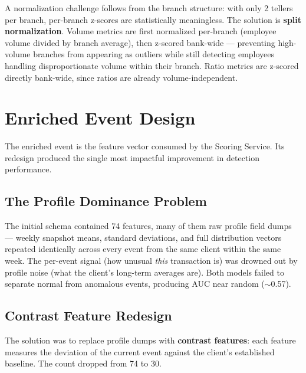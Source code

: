 A normalization challenge follows from the branch structure: with only 2 tellers per branch, per-branch z-scores are statistically meaningless. The solution is \textbf{split normalization}. Volume metrics are first normalized per-branch (employee volume divided by branch average), then z-scored bank-wide --- preventing high-volume branches from appearing as outliers while still detecting employees handling disproportionate volume within their branch. Ratio metrics are z-scored directly bank-wide, since ratios are already volume-independent.

\section{Enriched Event Design}

The enriched event is the feature vector consumed by the Scoring Service. Its redesign produced the single most impactful improvement in detection performance.

\subsection{The Profile Dominance Problem}

The initial schema contained 74 features, many of them raw profile field dumps --- weekly snapshot means, standard deviations, and full distribution vectors repeated identically across every event from the same client within the same week. The per-event signal (how unusual \emph{this} transaction is) was drowned out by profile noise (what the client's long-term averages are). Both models failed to separate normal from anomalous events, producing AUC near random ($\sim$0.57).

\subsection{Contrast Feature Redesign}

The solution was to replace profile dumps with \textbf{contrast features}: each feature measures the deviation of the current event against the client's established baseline. The count dropped from 74 to 30.

